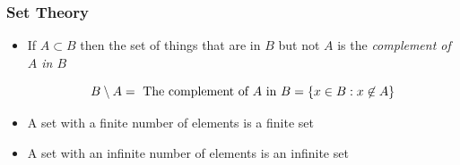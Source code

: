 \documentclass{beamer}
\numberwithin{equation}{section}
\begin{document}












\begin{frame}
\frametitle{Set Theory}

\begin{itemize}
\item If $A\subset B$ then the set of things that are in $B$ but not $A$ is the \textit{complement of $A$ in $B$} \pause

$$B\setminus A= \hbox{ The complement of $A$ in $B$} = \{x\in B: x\not\in A\}$$ \pause

\item A set with a finite number of elements is a finite set \pause

\item A set with an infinite number of elements is an infinite set
\end{itemize}
\end{frame}
\end{document}
